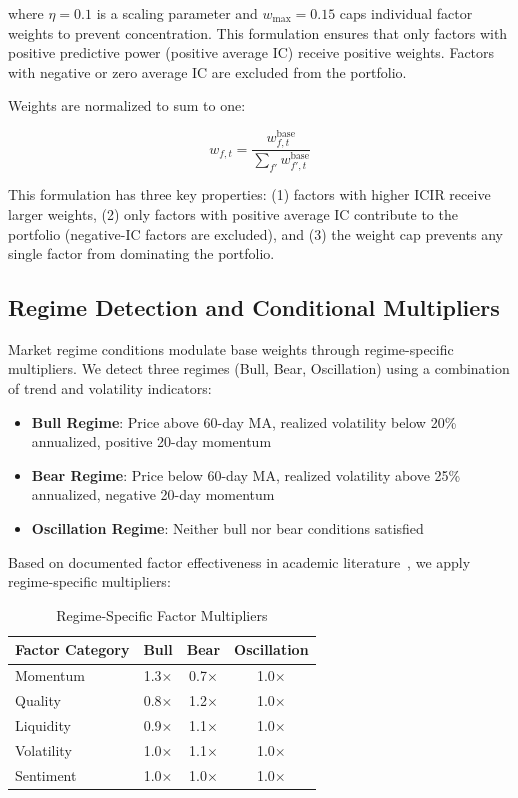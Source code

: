 where $\eta = 0.1$ is a scaling parameter and $w_{\text{max}} = 0.15$ caps individual factor weights to prevent concentration. This formulation ensures that only factors with positive predictive power (positive average IC) receive positive weights. Factors with negative or zero average IC are excluded from the portfolio.

Weights are normalized to sum to one:

\begin{equation}
w_{f,t} = \frac{w_{f,t}^{\text{base}}}{\sum_{f'} w_{f',t}^{\text{base}}}
\end{equation}

This formulation has three key properties: (1) factors with higher ICIR receive larger weights, (2) only factors with positive average IC contribute to the portfolio (negative-IC factors are excluded), and (3) the weight cap prevents any single factor from dominating the portfolio.

\subsection{Regime Detection and Conditional Multipliers}

Market regime conditions modulate base weights through regime-specific multipliers. We detect three regimes (Bull, Bear, Oscillation) using a combination of trend and volatility indicators:

\begin{itemize}
    \item \textbf{Bull Regime}: Price above 60-day MA, realized volatility below 20\% annualized, positive 20-day momentum
    \item \textbf{Bear Regime}: Price below 60-day MA, realized volatility above 25\% annualized, negative 20-day momentum
    \item \textbf{Oscillation Regime}: Neither bull nor bear conditions satisfied
\end{itemize}

Based on documented factor effectiveness in academic literature~\cite{arnott2016timing,blitz2020factormomentum}, we apply regime-specific multipliers:

\begin{table}[h]
\centering
\caption{Regime-Specific Factor Multipliers}
\label{tab:multipliers}
\begin{tabular}{lccc}
\toprule
Factor Category & Bull & Bear & Oscillation \\
\midrule
Momentum & 1.3$\times$ & 0.7$\times$ & 1.0$\times$ \\
Quality & 0.8$\times$ & 1.2$\times$ & 1.0$\times$ \\
Liquidity & 0.9$\times$ & 1.1$\times$ & 1.0$\times$ \\
Volatility & 1.0$\times$ & 1.1$\times$ & 1.0$\times$ \\
Sentiment & 1.0$\times$ & 1.0$\times$ & 1.0$\times$ \\
\bottomrule
\end{tabular}
\end{table}

